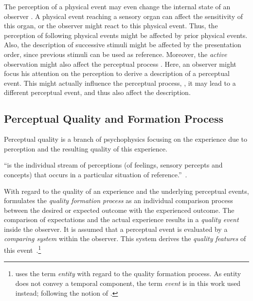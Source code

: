 The perception of a physical event may even change the internal state of an observer \citep{raake_quality_2014}.
A physical event reaching a sensory organ can affect the sensitivity of this organ, or the observer might react to this physical event.
Thus, the perception of following physical events might be affected by prior physical events.
Also, the description of successive stimuli might be affected by the presentation order, since previous stimuli can be used as reference.
Moreover, the \emph{active} observation might also affect the perceptual process \citep[][p.\,30]{raake_quality_2014}.
Here, an observer might focus his attention on the perception to derive a description of a perceptual event.
This might actually influence the perceptual process, \ie, it may lead to a different perceptual event, and thus also affect the description.


\subsection{Perceptual Quality and Formation Process}\label{related:perceivedQuality}
Perceptual quality is a branch of psychophysics focusing on the experience due to perception and the resulting quality of this experience.
\begin{definition}[Experiencing]
``is the individual stream of perceptions (of feelings, sensory percepts and concepts) that occurs in a particular situation of reference.''~\citep[p.\,13]{raake_quality_2014}.
\end{definition}

With regard to the quality of an experience and the underlying perceptual events, \citet{jekosch_voice_2005} formulates the \emph{quality formation process} as an individual comparison process between the desired or expected outcome with the experienced outcome.
The comparison of expectations and the actual experience results in a \emph{quality event} inside the observer.
It is assumed that a perceptual event is evaluated by a \emph{comparing system} within the observer.
This system derives the \emph{quality features} of this event~\citep[\cf,][p.\,17]{jekosch_voice_2005}.\footnote{\citet{jekosch_voice_2005} uses the term \emph{entity} with regard to the quality formation process.
As entity does not convey a temporal component, the term \emph{event} is in this work used instead; following the notion of \citet{blauert_spatial_1996}.}

